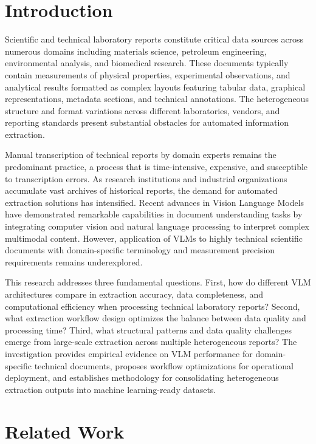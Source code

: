 \documentclass{svproc}
\begin{document}
\section{Introduction}

Scientific and technical laboratory reports constitute critical data sources across numerous domains including materials science, petroleum engineering, environmental analysis, and biomedical research. These documents typically contain measurements of physical properties, experimental observations, and analytical results formatted as complex layouts featuring tabular data, graphical representations, metadata sections, and technical annotations. The heterogeneous structure and format variations across different laboratories, vendors, and reporting standards present substantial obstacles for automated information extraction.

Manual transcription of technical reports by domain experts remains the predominant practice, a process that is time-intensive, expensive, and susceptible to transcription errors. As research institutions and industrial organizations accumulate vast archives of historical reports, the demand for automated extraction solutions has intensified. Recent advances in Vision Language Models have demonstrated remarkable capabilities in document understanding tasks by integrating computer vision and natural language processing to interpret complex multimodal content. However, application of VLMs to highly technical scientific documents with domain-specific terminology and measurement precision requirements remains underexplored.

This research addresses three fundamental questions. First, how do different VLM architectures compare in extraction accuracy, data completeness, and computational efficiency when processing technical laboratory reports? Second, what extraction workflow design optimizes the balance between data quality and processing time? Third, what structural patterns and data quality challenges emerge from large-scale extraction across multiple heterogeneous reports? The investigation provides empirical evidence on VLM performance for domain-specific technical documents, proposes workflow optimizations for operational deployment, and establishes methodology for consolidating heterogeneous extraction outputs into machine learning-ready datasets.

\section{Related Work}
\end{document}
